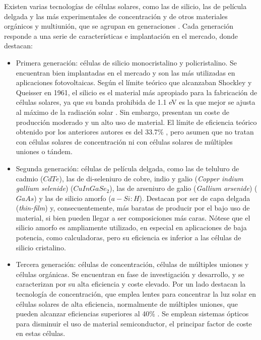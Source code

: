 Existen varias tecnologías de células solares, como las de silicio, las de película delgada y las más experimentales de concentración y de otros materiales orgánicos y multiunión, que se agrupan en generaciones \cite{Shubbak_2019}. Cada generación responde a una serie de características e implantación en el mercado, donde destacan:

\begin{itemize}
      \item Primera generación: células de silicio monocristalino y policristalino.
            Se encuentran bien implantadas en el mercado y son las más utilizadas en aplicaciones fotovoltaicas. Según el límite teórico que alcanzaban Shockley y Queisser en 1961, el silicio es el material más apropiado para la fabricación de células solares, ya que su banda prohibida de 1.1 eV es la que mejor se ajusta al máximo de la radiación solar \cite[][p. 1126]{böer2002survey}. Sin embargo, presentan un coste de producción moderado y un alto uso de material. El límite de eficiencia teórico obtenido por los anteriores autores es del 33.7\% \cite{Shockley_Queisser_1961}, pero asumen que no tratan con células solares de concentración ni con células solares de múltiples uniones o tándem.
      \item Segunda generación: células de película delgada, como las de teluluro de cadmio ($CdTe$), las de di-seleniuro de cobre, indio y galio (\textit{Copper indium gallium selenide}) ($CuInGaSe_2$), las de arseniuro de galio (\textit{Gallium arsenide}) ($GaAs$) y las de silicio amorfo ($a-Si:H$).
            Destacan por ser de capa delgada (\textit{thin-film}) y, consecuentemente, más baratas de producir por el bajo uso de material, si bien pueden llegar a ser composiciones más caras.
            Nótese que el silicio amorfo es ampliamente utilizado, en especial en aplicaciones de baja potencia, como calculadoras, pero su eficiencia es inferior a las células de silicio cristalino.
      \item Tercera generación: células de concentración, células de múltiples uniones y células orgánicas.
            Se encuentran en fase de investigación y desarrollo, y se caracterizan por su alta eficiencia y coste elevado.
            Por un lado destacan la tecnología de concentración, que emplea lentes para concentrar la luz solar en células solares de alta eficiencia, normalmente de múltiples uniones, que pueden alcanzar eficiencias superiores al 40\% \cite[][Tabla 5]{Green_Dunlop_Yoshita_Kopidakis_Bothe_Siefer_Hao_2024}. Se emplean sistemas ópticos para disminuir el uso de material semiconductor, el principar factor de coste en estas células.
\end{itemize}

